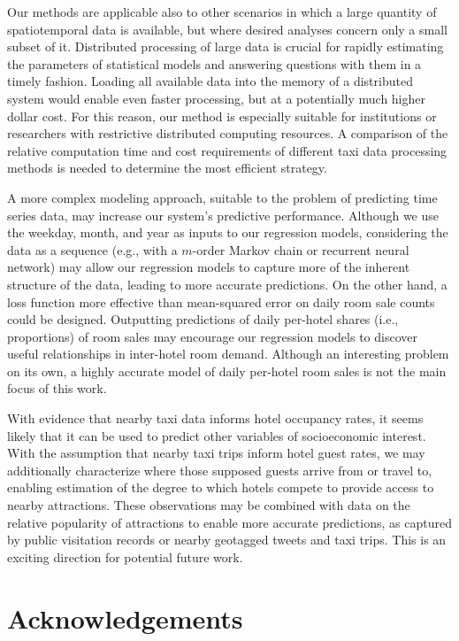 \documentclass[useAMS, referee, usenatbib]{biom}
\begin{document}
Our methods are applicable also to other scenarios in which a large quantity of spatiotemporal data is available, but where desired analyses concern only a small subset of it. Distributed processing of large data is crucial for rapidly estimating the parameters of statistical models and answering questions with them in a timely fashion. Loading all available data into the memory of a distributed system would enable even faster processing, but at a potentially much higher dollar cost. For this reason, our method is especially suitable for institutions or researchers with restrictive distributed computing resources. A comparison of the relative computation time and cost requirements of different taxi data processing methods is needed to determine the most efficient strategy.

A more complex modeling approach, suitable to the problem of predicting time series data, may increase our system's predictive performance. Although we use the weekday, month, and year as inputs to our regression models, considering the data as a sequence (e.g., with a $m$-order Markov chain or recurrent neural network) may allow our regression models to capture more of the inherent structure of the data, leading to more accurate predictions. On the other hand, a loss function more effective than mean-squared error on daily room sale counts could be designed. Outputting predictions of daily per-hotel shares (i.e., proportions) of room sales may encourage our regression models to discover useful relationships in inter-hotel room demand. Although an interesting problem on its own, a highly accurate model of daily per-hotel room sales is not the main focus of this work.

With evidence that nearby taxi data informs hotel occupancy rates, it seems likely that it can be used to predict other variables of socioeconomic interest. With the assumption that nearby taxi trips inform hotel guest rates, we may additionally characterize where those supposed guests arrive from or travel to, enabling estimation of the degree to which hotels compete to provide access to nearby attractions. These observations may be combined with data on the relative popularity of attractions to enable more accurate predictions, as captured by public visitation records or nearby geotagged tweets and taxi trips. This is an exciting direction for potential future work.

\backmatter

\section*{Acknowledgements}
\end{document}
